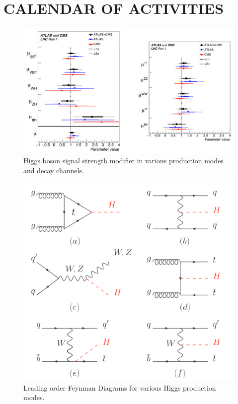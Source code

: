 \documentclass[final,3p]{CSP}
\begin{document}
\section{CALENDAR OF ACTIVITIES}

\newpage

\begin{figure}
  \centering
   \includegraphics[width=\columnwidth]{./cms7.jpg}
  \caption{Higgs boson signal strength modifier in various production modes and decay channels.}
   \label{figure 10}
\end{figure}

\begin{figure}
  \centering
   \includegraphics[width=\columnwidth]{./cd.png}
  \caption{Leading order Feynman Diagrams for various Higgs production modes.}
   \label{figure 11}
\end{figure}
\end{document}
